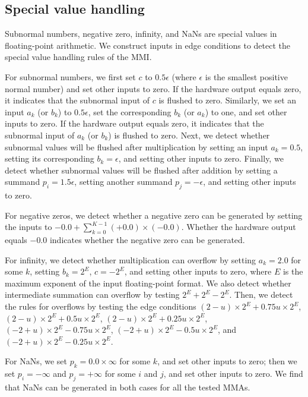 \subsection{Special value handling}

Subnormal numbers, negative zero, infinity, and NaNs are special values in floating-point arithmetic. We construct inputs in edge conditions to detect the special value handling rules of the MMI.

For subnormal numbers, we first set $c$ to $0.5\epsilon$ (where $\epsilon$ is the smallest positive normal number) and set other inputs to zero. If the hardware output equals zero, it indicates that the subnormal input of $c$ is flushed to zero. Similarly, we set an input $a_k$ (or $b_k$) to $0.5\epsilon$, set the corresponding $b_k$ (or $a_k$) to one, and set other inputs to zero. If the hardware output equals zero, it indicates that the subnormal input of $a_k$ (or $b_k$) is flushed to zero. Next, we detect whether subnormal values will be flushed after multiplication by setting an input $a_k=0.5$, setting its corresponding $b_k=\epsilon$, and setting other inputs to zero. Finally, we detect whether subnormal values will be flushed after addition by setting a summand $p_i=1.5\epsilon$, setting another summand $p_j=-\epsilon$, and setting other inputs to zero.

For negative zeros, we detect whether a negative zero can be generated by setting the inputs to $-0.0+\sum_{k=0}^{K-1}(+0.0)\times(-0.0)$. Whether the hardware output equals $-0.0$ indicates whether the negative zero can be generated.

For infinity, we detect whether multiplication can overflow by setting $a_k=2.0$ for some $k$, setting $b_k=2^E$, $c=-2^E$, and setting other inputs to zero, where $E$ is the maximum exponent of the input floating-point format. We also detect whether intermediate summation can overflow by testing $2^E+2^E-2^E$. Then, we detect the rules for overflows by testing the edge conditions $(2-u)\times2^E+0.75u\times2^E$, $(2-u)\times2^E+0.5u\times2^E$, $(2-u)\times2^E+0.25u\times2^E$, $(-2+u)\times2^E-0.75u\times2^E$, $(-2+u)\times2^E-0.5u\times2^E$, and $(-2+u)\times2^E-0.25u\times2^E$.

For NaNs, we set $p_k=0.0\times\infty$ for some $k$, and set other inputs to zero; then we set $p_i=-\infty$ and $p_j=+\infty$ for some $i$ and $j$, and set other inputs to zero. We find that NaNs can be generated in both cases for all the tested MMAs.
